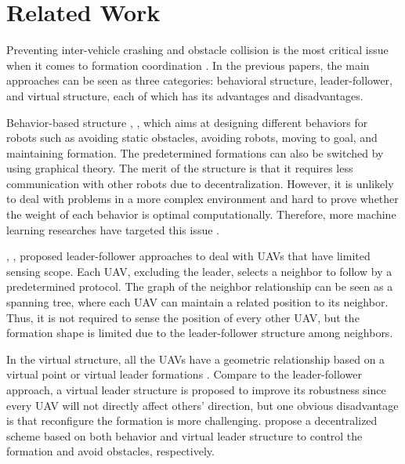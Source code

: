 \chapter{Related Work}

Preventing inter-vehicle crashing and obstacle collision is the most critical issue when it comes to formation coordination \citep{580977}. In the previous papers, the main approaches can be seen as three categories: behavioral structure, leader-follower, and virtual structure, each of which has its advantages and disadvantages.

Behavior-based structure \citep{balch1998behavior}, \citep{1261347}, which aims at designing different behaviors for robots such as avoiding static obstacles, avoiding robots, moving to goal, and maintaining formation. The predetermined formations can also be switched by using graphical theory. The merit of the structure is that it requires less communication with other robots due to decentralization. However, it is unlikely to deal with problems in a more complex environment and hard to prove whether the weight of each behavior is optimal computationally. Therefore, more machine learning researches have targeted this issue \citep{bithas2019survey}.

\citet{tanner2004leader}, \citet{fredslund2002general}, \citet{luo2013uav} proposed leader-follower approaches to deal with UAVs that have limited sensing scope. Each UAV, excluding the leader, selects a neighbor to follow by a predetermined protocol. The graph of the neighbor relationship can be seen as a spanning tree, where each UAV can maintain a related position to its neighbor. Thus, it is not required to sense the position of every other UAV, but the formation shape is limited due to the leader-follower structure among neighbors. 

In the virtual structure, all the UAVs have a geometric relationship based on a virtual point or virtual leader formations \citep{beard2001coordination}. Compare to the leader-follower approach, a virtual leader structure is proposed to improve its robustness since every UAV will not directly affect others' direction, but one obvious disadvantage is that reconfigure the formation is more challenging. \citet{6451251} propose a decentralized scheme based on both behavior and virtual leader structure to control the formation and avoid obstacles, respectively.

